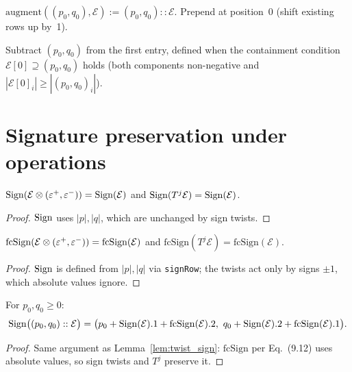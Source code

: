 \begin{definition}
  \label{def:augment}
  \leanok
  $\mathrm{augment}((p_0, q_0), \mathcal{E}) := (p_0, q_0) :: \mathcal{E}$.
  Prepend at position~0 (shift existing rows up by~1).
\end{definition}

\begin{definition}
  \label{def:truncate}
  \leanok
  Subtract $(p_0, q_0)$ from the first entry, defined when the containment condition
  $\mathcal{E}[0] \supseteq (p_0, q_0)$ holds (both components non-negative and
  $|\mathcal{E}[0]_i| \geq |(p_0, q_0)_i|$).
\end{definition}

\section{Signature preservation under operations}

\begin{lemma}
  \label{lem:twist_sign}
  \leanok
  $\mathrm{Sign}(\mathcal{E} \otimes (\varepsilon^+, \varepsilon^-)) = \mathrm{Sign}(\mathcal{E})$ and $\mathrm{Sign}(T^j \mathcal{E}) = \mathrm{Sign}(\mathcal{E})$.
\end{lemma}
\begin{proof}
  \leanok
  $\mathrm{Sign}$ uses $|p|, |q|$, which are unchanged by sign twists.
\end{proof}

\begin{lemma}
  \label{lem:twist_fcSign}
  \leanok
  $\mathrm{fcSign}(\mathcal{E} \otimes (\varepsilon^+, \varepsilon^-)) = \mathrm{fcSign}(\mathcal{E})$ and $\mathrm{fcSign}(T^j \mathcal{E}) = \mathrm{fcSign}(\mathcal{E})$.
\end{lemma}
\begin{proof}
  \leanok
  $\mathrm{Sign}$ is defined from $|p|, |q|$ via \texttt{signRow}; the twists act only by signs $\pm 1$, which absolute values ignore.
\end{proof}


\begin{lemma}
  \label{lem:augment_sign}
  \leanok
  For $p_0, q_0 \geq 0$:
  \[
    \mathrm{Sign}\big((p_0, q_0) :: \mathcal{E}\big) = \big(p_0 + \mathrm{Sign}(\mathcal{E}).1 + \mathrm{fcSign}(\mathcal{E}).2,\ q_0 + \mathrm{Sign}(\mathcal{E}).2 + \mathrm{fcSign}(\mathcal{E}).1\big).
  \]
\end{lemma}
\begin{proof}
  \leanok
  Same argument as Lemma~\ref{lem:twist_sign}: $\mathrm{fcSign}$ per Eq.~(9.12) uses absolute values, so sign twists and $T^j$ preserve it.
\end{proof}


